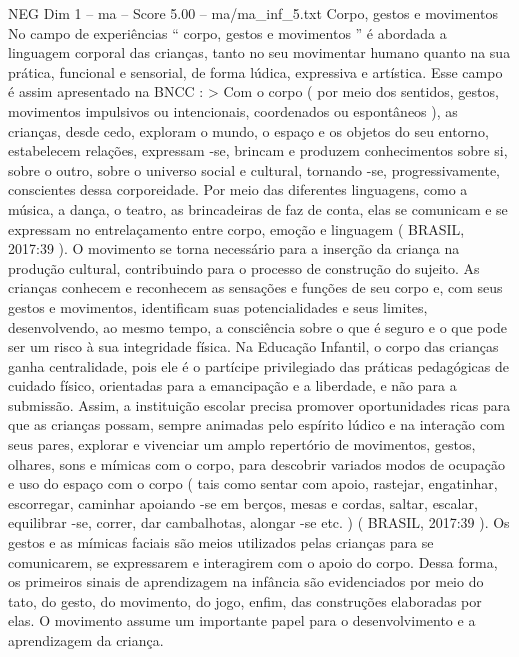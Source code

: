 \begin{textsample}{NEG Dim 1 – ma – Score 5.00 – ma/ma\_inf\_5.txt}
Corpo, gestos e movimentos No campo de experiências “ corpo, gestos e movimentos ” é abordada a linguagem corporal das crianças, tanto no seu movimentar humano quanto na sua prática, funcional e sensorial, de forma lúdica, expressiva e artística.
Esse campo é assim apresentado na BNCC : > Com o corpo ( por meio dos sentidos, gestos, movimentos impulsivos ou intencionais, coordenados ou espontâneos ), as crianças, desde cedo, exploram o mundo, o espaço e os objetos do seu entorno, estabelecem relações, expressam -se, brincam e produzem conhecimentos sobre si, sobre o outro, sobre o universo social e cultural, tornando -se, progressivamente, conscientes dessa corporeidade.
Por meio das diferentes linguagens, como a música, a dança, o teatro, as brincadeiras de faz de conta, elas se comunicam e se expressam no entrelaçamento entre corpo, emoção e linguagem ( BRASIL, 2017:39 ).
O movimento se torna necessário para a inserção da criança na produção cultural, contribuindo para o processo de construção do sujeito.
As crianças conhecem e reconhecem as sensações e funções de seu corpo e, com seus gestos e movimentos, identificam suas potencialidades e seus limites, desenvolvendo, ao mesmo tempo, a consciência sobre o que é seguro e o que pode ser um risco à sua integridade física.
Na Educação Infantil, o corpo das crianças ganha centralidade, pois ele é o partícipe privilegiado das práticas pedagógicas de cuidado físico, orientadas para a emancipação e a liberdade, e não para a submissão.
Assim, a instituição escolar precisa promover oportunidades ricas para que as crianças possam, sempre animadas pelo espírito lúdico e na interação com seus pares, explorar e vivenciar um amplo repertório de movimentos, gestos, olhares, sons e mímicas com o corpo, para descobrir variados modos de ocupação e uso do espaço com o corpo ( tais como sentar com apoio, rastejar, engatinhar, escorregar, caminhar apoiando -se em berços, mesas e cordas, saltar, escalar, equilibrar -se, correr, dar cambalhotas, alongar -se etc. ) ( BRASIL, 2017:39 ).
Os gestos e as mímicas faciais são meios utilizados pelas crianças para se comunicarem, se expressarem e interagirem com o apoio do corpo.
Dessa forma, os primeiros sinais de aprendizagem na infância são evidenciados por meio do tato, do gesto, do movimento, do jogo, enfim, das construções elaboradas por elas.
O movimento assume um importante papel para o desenvolvimento e a aprendizagem da criança.

\end{textsample}

